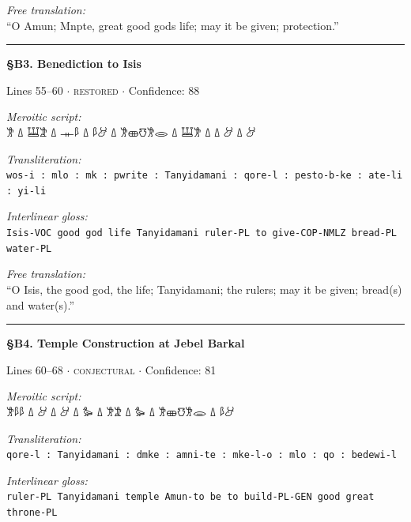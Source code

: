 \documentclass[11pt,a4paper]{article}
\begin{document}
{{{{{{{{{{\vspace{4pt}
\noindent\textit{Free translation:}\\[2pt]
``O Amun; Mnpte, great good gods life; may it be given; protection.''

\vspace{2pt}
\noindent\rule{\textwidth}{0.3pt}


\vspace{6pt}
\noindent\textbf{\S B3. Benediction to Isis}
\hfill {\small Lines 55–60 $\cdot$ \textsc{restored} $\cdot$ Confidence: 88%

\vspace{3pt}
\noindent\textit{Meroitic script:}\\[2pt]
{\meroitic 𐦃 𐦗 𐦃 𐦗  𐦗 𐦂𐦓 𐦗 𐦑𐦂𐦒𐦈𐦂 𐦗 𐦃𐦁 𐦗 𐦁𐦔 𐦗 𐦀𐦓 𐦗 𐦂}

\vspace{4pt}
\noindent\textit{Transliteration:}\\[2pt]
\texttt{wos-i : mlo : mk : pwrite : Tanyidamani : qore-l : pesto-b-ke : ate-li : yi-li}

\vspace{4pt}
\noindent\textit{Interlinear gloss:}\\[2pt]
{\small\texttt{Isis-VOC  good  god  life  Tanyidamani  ruler-PL  to give-COP-NMLZ  bread-PL  water-PL}}

\vspace{4pt}
\noindent\textit{Free translation:}\\[2pt]
``O Isis, the good god, the life; Tanyidamani; the rulers; may it be given; bread(s) and water(s).''

\vspace{2pt}
\noindent\rule{\textwidth}{0.3pt}


\vspace{6pt}
\noindent\textbf{\S B4. Temple Construction at Jebel Barkal}
\hfill {\small Lines 60–68 $\cdot$ \textsc{conjectural} $\cdot$ Confidence: 81%

\vspace{3pt}
\noindent\textit{Meroitic script:}\\[2pt]
{\meroitic 𐦃𐦁 𐦗 𐦑𐦂𐦒𐦈𐦂 𐦗 𐦖 𐦗 𐦀𐦂 𐦗 𐦖 𐦗 𐦃 𐦗 𐦃 𐦗 𐦁𐦁𐦂}

\vspace{4pt}
\noindent\textit{Transliteration:}\\[2pt]
\texttt{qore-l : Tanyidamani : dmke : amni-te : mke-l-o : mlo : qo : bedewi-l}

\vspace{4pt}
\noindent\textit{Interlinear gloss:}\\[2pt]
{\small\texttt{ruler-PL  Tanyidamani  temple  Amun-to be  to build-PL-GEN  good  great  throne-PL}}

}}}}}}}}}}}}
\end{document}
